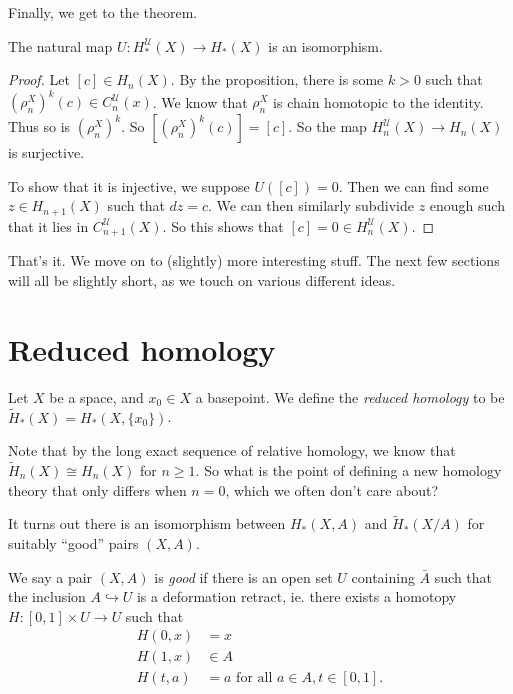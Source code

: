 \documentclass[a4paper]{article}
\begin{document}
Finally, we get to the theorem.
\begin{thm}
  The natural map $U: H_*^\mathcal{U}(X) \to H_*(X)$ is an isomorphism.
\end{thm}

\begin{proof}
  Let $[c] \in H_n(X)$. By the proposition, there is some $k > 0$ such that $(\rho_n^X)^k (c) \in C_n^{\mathcal{U}}(x)$. We know that $\rho_n^X$ is chain homotopic to the identity. Thus so is $(\rho_n^X)^k$. So $[(\rho_n^X)^k (c)] = [c]$. So the map $H_n^\mathcal{U}(X) \to H_n(X)$ is surjective.

  To show that it is injective, we suppose $U([c]) = 0$. Then we can find some $z \in H_{n + 1}(X)$ such that $dz = c$. We can then similarly subdivide $z$ enough such that it lies in $C^\mathcal{U}_{n + 1}(X)$. So this shows that $[c] = 0 \in H_n^{\mathcal{U}}(X)$.
\end{proof}

That's it. We move on to (slightly) more interesting stuff. The next few sections will all be slightly short, as we touch on various different ideas.

\section{Reduced homology}

\begin{defi}
  Let $X$ be a space, and $x_0 \in X$ a basepoint. We define the \emph{reduced homology} to be $\tilde{H}_*(X) = H_*(X, \{x_0\})$.
\end{defi}
Note that by the long exact sequence of relative homology, we know that $\tilde{H}_n(X) \cong H_n(X)$ for $n \geq 1$. So what is the point of defining a new homology theory that only differs when $n = 0$, which we often don't care about?

It turns out there is an isomorphism between $H_*(X, A)$ and $\tilde{H}_*(X/A)$ for suitably ``good'' pairs $(X, A)$.

\begin{defi}
  We say a pair $(X, A)$ is \emph{good} if there is an open set $U$ containing $\bar{A}$ such that the inclusion $A \hookrightarrow U$ is a deformation retract, ie. there exists a homotopy $H: [0, 1] \times U \to U$ such that
  \begin{align*}
    H(0, x) &= x\\
    H(1, x) &\in A\\
    H(t, a) &= a\text{ for all $a \in A, t \in [0, 1]$}.
  \end{align*}
\end{defi}
\end{document}
